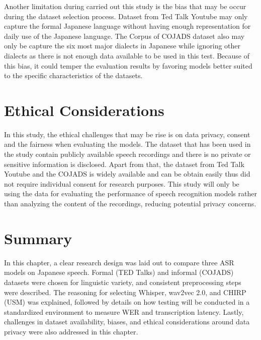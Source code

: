Another limitation during carried out this study is the bias that may be occur during the dataset selection process. Dataset from Ted Talk Youtube may only capture the formal Japanese language without having enough representation for daily use of the Japanese language. The Corpus of COJADS dataset also may only be capture the six most major dialects in Japanese while ignoring other dialects as there is not enough data available to be used in this test. Because of this bias, it could temper the evaluation results by favoring models better suited to the specific characteristics of the datasets. 

\section{Ethical Considerations}  
In this study, the ethical challenges that may be rise is on data privacy, consent and the fairness when evaluating the models. The dataset that has been used in the study contain publicly available speech recordings and there is no private or sensitive information is disclosed. Apart from that, the dataset from Ted Talk Youtube and the COJADS is widely available and can be obtain easily thus did not require individual consent for research purposes. This study will only be using the data for evaluating the performance of speech recognition models rather than analyzing the content of the recordings, reducing potential privacy concerns.

\section{Summary}
In this chapter, a clear research design was laid out to compare three ASR models on Japanese speech. Formal (TED Talks) and informal (COJADS) datasets were chosen for linguistic variety, and consistent preprocessing steps were described. The reasoning for selecting Whisper, wav2vec 2.0, and CHIRP (USM) was explained, followed by details on how testing will be conducted in a standardized environment to measure WER and transcription latency. Lastly, challenges in dataset availability, biases, and ethical considerations around data privacy were also addressed in this chapter.